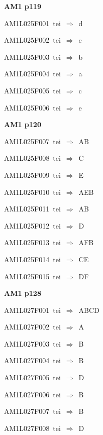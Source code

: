 \par\vfill\eject
{\bf\hfill AM1 p119\hfill\hbox{}}\par\bigskip
{\sixrm AM1L025F001\ {\sixit tei}\ }$\Rightarrow$\ {\tenit d}\par\smallskip
{\sixrm AM1L025F002\ {\sixit tei}\ }$\Rightarrow$\ {\tenit e}\par\smallskip
{\sixrm AM1L025F003\ {\sixit tei}\ }$\Rightarrow$\ {\tenit b}\par\smallskip
{\sixrm AM1L025F004\ {\sixit tei}\ }$\Rightarrow$\ {\tenit a}\par\smallskip
{\sixrm AM1L025F005\ {\sixit tei}\ }$\Rightarrow$\ {\tenit c}\par\smallskip
{\sixrm AM1L025F006\ {\sixit tei}\ }$\Rightarrow$\ {\tenit e}\par\smallskip

\par\vfill\eject
{\bf\hfill AM1 p120\hfill\hbox{}}\par\bigskip
{\sixrm AM1L025F007\ {\sixit tei}\ }$\Rightarrow$\ AB\par\smallskip
{\sixrm AM1L025F008\ {\sixit tei}\ }$\Rightarrow$\ C\par\smallskip
{\sixrm AM1L025F009\ {\sixit tei}\ }$\Rightarrow$\ E\par\smallskip
{\sixrm AM1L025F010\ {\sixit tei}\ }$\Rightarrow$\ AEB\par\smallskip
{\sixrm AM1L025F011\ {\sixit tei}\ }$\Rightarrow$\ AB\par\smallskip
{\sixrm AM1L025F012\ {\sixit tei}\ }$\Rightarrow$\ D\par\smallskip
{\sixrm AM1L025F013\ {\sixit tei}\ }$\Rightarrow$\ AFB\par\smallskip
{\sixrm AM1L025F014\ {\sixit tei}\ }$\Rightarrow$\ CE\par\smallskip
{\sixrm AM1L025F015\ {\sixit tei}\ }$\Rightarrow$\ DF\par\smallskip

\par\vfill\eject
{\bf\hfill AM1 p128\hfill\hbox{}}\par\bigskip
{\sixrm AM1L027F001\ {\sixit tei}\ }$\Rightarrow$\ ABCD\par\smallskip
{\sixrm AM1L027F002\ {\sixit tei}\ }$\Rightarrow$\ A\par\smallskip
{\sixrm AM1L027F003\ {\sixit tei}\ }$\Rightarrow$\ B\par\smallskip
{\sixrm AM1L027F004\ {\sixit tei}\ }$\Rightarrow$\ B\par\smallskip
{\sixrm AM1L027F005\ {\sixit tei}\ }$\Rightarrow$\ D\par\smallskip
{\sixrm AM1L027F006\ {\sixit tei}\ }$\Rightarrow$\ B\par\smallskip
{\sixrm AM1L027F007\ {\sixit tei}\ }$\Rightarrow$\ B\par\smallskip
{\sixrm AM1L027F008\ {\sixit tei}\ }$\Rightarrow$\ D\par\smallskip


